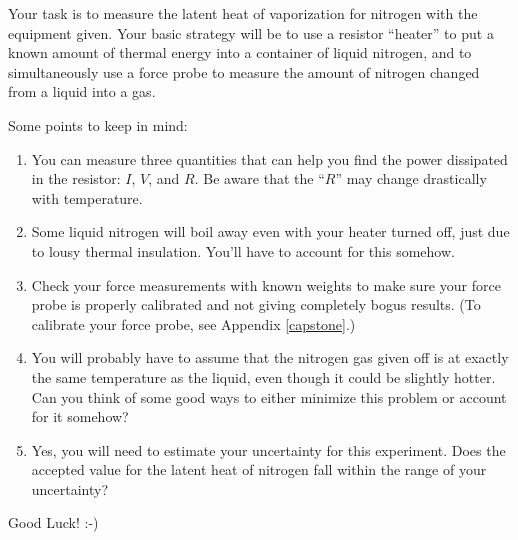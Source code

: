 Your task is to measure the latent heat of vaporization for nitrogen with the equipment given.
Your basic strategy will be to use a resistor ``heater'' to put a known amount of thermal
energy into a container of liquid nitrogen, and to simultaneously use a force probe to
measure the amount of nitrogen changed from a liquid into a gas.

Some points to keep in mind:

\begin{enumerate}

\item You can measure three quantities that can help you find the power
dissipated in the resistor: $I$, $V$, and $R$. Be aware that the ``$\!R$'' may change drastically with temperature.

\item Some liquid nitrogen will boil away even with your heater turned off, just due to lousy thermal insulation. You'll have to account for this somehow.

\item Check your force measurements with known weights to make sure your force probe is properly calibrated and not giving completely bogus results.  (To calibrate your force probe, see Appendix \ref{capstone}.) 

\item You will probably have to assume that the nitrogen gas given off is at exactly the same temperature as the liquid, even though it could be slightly hotter. Can you think of some good ways to either minimize this problem or account for it somehow?

\item Yes, you will need to estimate your uncertainty for this experiment. Does the accepted value for the latent heat of nitrogen fall within the range of your uncertainty?

\end{enumerate}

Good Luck!  :-)
